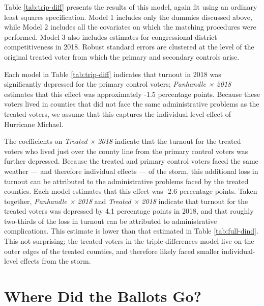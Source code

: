 \documentclass[
  12pt,
]{article}
\begin{document}
Table \ref{tab:trip-diff} presents the results of this model, again fit using an ordinary least squares specification. Model 1 includes only the dummies discussed above, while Model 2 includes all the covariates on which the matching procedures were performed. Model 3 also includes estimates for congressional district competitiveness in 2018. Robust standard errors are clustered at the level of the original treated voter from which the primary and secondary controls arise.

\begin{singlespace}


\end{singlespace}

Each model in Table \ref{tab:trip-diff} indicates that turnout in 2018 was significantly depressed for the primary control voters; \emph{Panhandle × 2018} estimates that this effect was approximately -1.5 percentage points. Because these voters lived in counties that did not face the same administrative problems as the treated voters, we assume that this captures the individual-level effect of Hurricane Michael.

The coefficients on \emph{Treated × 2018} indicate that the turnout for the treated voters who lived just over the county line from the primary control voters was further depressed. Because the treated and primary control voters faced the same weather --- and therefore individual effects --- of the storm, this additional loss in turnout can be attributed to the administrative problems faced by the treated counties. Each model estimates that this effect was -2.6 percentage points. Taken together, \emph{Panhandle × 2018} and \emph{Treated × 2018} indicate that turnout for the treated voters was depressed by 4.1 percentage points in 2018, and that roughly two-thirds of the loss in turnout can be attributed to administrative complications. This estimate is lower than that estimated in Table \ref{tab:full-dind}. This not surprising; the treated voters in the triple-differences model live on the outer edges of the treated counties, and therefore likely faced smaller individual-level effects from the storm.

\hypertarget{where-did-the-ballots-go}{%
\section*{Where Did the Ballots Go?}\label{where-did-the-ballots-go}}
\end{document}
